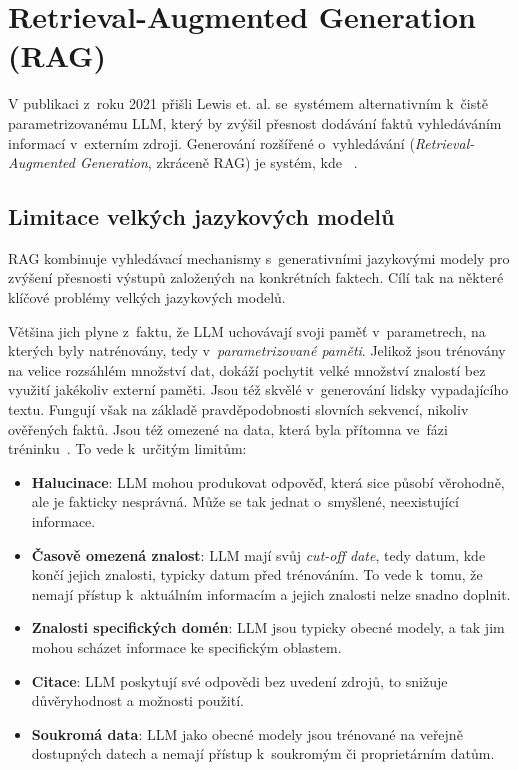 \chapter{Retrieval-Augmented Generation (RAG)}
\label{rag}
V publikaci z~roku 2021 přišli Lewis et. al. \cite{lewis2020_retrieval_augmented_generation} se~systémem alternativním k~čistě parametrizovanému LLM, který by zvýšil přesnost dodávání faktů vyhledáváním informací v~externím zdroji. Generování rozšířené o~vyhledávání (\textit{Retrieval-Augmented Generation}, zkráceně RAG) je systém, kde ~\cite{lewis2020_retrieval_augmented_generation}.

\section{Limitace velkých jazykových modelů}
RAG kombinuje vyhledávací mechanismy s~generativními jazykovými modely pro zvýšení přesnosti výstupů založených na konkrétních faktech. Cílí tak na některé klíčové problémy velkých jazykových modelů.

Většina jich plyne z~faktu, že LLM uchovávají svoji paměť v~parametrech, na kterých byly natrénovány, tedy v~\textit{parametrizované paměti}. Jelikož jsou trénovány na velice rozsáhlém množství dat, dokáží pochytit velké množství znalostí bez využití jakékoliv externí paměti. Jsou též skvělé v~generování lidsky vypadajícího textu. Fungují však na základě pravděpodobnosti slovních sekvencí, nikoliv ověřených faktů. Jsou též omezené na data, která byla přítomna ve~fázi tréninku~\cite{lewis2020_retrieval_augmented_generation, pan2024_retrieval_augmented_generation}. To vede k~určitým limitům:

\begin{itemize}
    \item \textbf{Halucinace}: LLM mohou produkovat odpověď, která sice působí věrohodně, ale je fakticky nesprávná. Může se tak jednat o~smyšlené, neexistující informace.
    \item \textbf{Časově omezená znalost}: LLM mají svůj \textit{cut-off date}, tedy datum, kde končí jejich znalosti, typicky datum před trénováním. To vede k~tomu, že nemají přístup k~aktuálním informacím a jejich znalosti nelze snadno doplnit.
    \item \textbf{Znalosti specifických domén}: LLM jsou typicky obecné modely, a tak jim mohou scházet informace ke specifickým oblastem.
    \item \textbf{Citace}: LLM poskytují své odpovědi bez uvedení zdrojů, to snižuje důvěryhodnost a možnosti použití.
    \item \textbf{Soukromá data}: LLM jako obecné modely jsou trénované na veřejně dostupných datech a nemají přístup k~soukromým či proprietárním datům.
\end{itemize}

